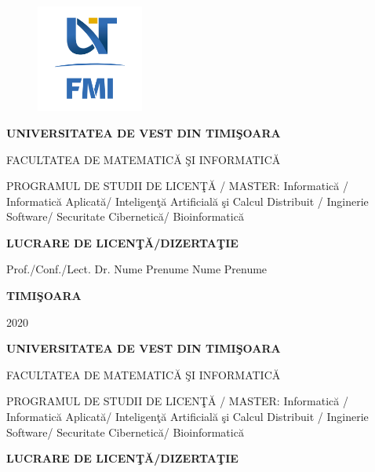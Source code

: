 \documentclass[12pt,a4paper]{report}
\theoremstyle{definition}
\theoremstyle{remark}
\begin{document}
\thispagestyle{empty}
\begin{center}
\begin{figure}[h!]
\vspace{-20pt}
\begin{center}
\includegraphics[width=100pt]{FMI-03.png}
\end{center}
\end{figure}


{\large{\bf UNIVERSITATEA DE VEST DIN TIMI\c SOARA

FACULTATEA DE MATEMATIC\u A \c SI INFORMATIC\u A

PROGRAMUL DE STUDII DE LICEN\c T\u A / MASTER: Informatic\u a / Informatic\u a Aplicat\u a/ Inteligen\c t\u a Artificial\u a \c si Calcul Distribuit / Inginerie Software/ Securitate Cibernetic\u a/ Bioinformatic\u a }}

\vspace{120pt}
{\huge {\bf LUCRARE DE LICEN\c T\u A/DIZERTA\c TIE}}

\vspace{150pt}
\end{center}

{\large{}

\noindent Prof./Conf./Lect. Dr. Nume Prenume \hfill Nume Prenume}

\vfill
\begin{center}
{\bf TIMI\c SOARA

2020}
\end{center}
\newpage
\thispagestyle{empty}
\begin{center}
{\large{\bf UNIVERSITATEA DE VEST DIN TIMI\c SOARA

FACULTATEA DE MATEMATIC\u A \c SI INFORMATIC\u A


PROGRAMUL DE STUDII DE LICEN\c T\u A / MASTER: Informatic\u a / Informatic\u a Aplicat\u a/ Inteligen\c t\u a Artificial\u a \c si Calcul Distribuit / Inginerie Software/ Securitate Cibernetic\u a/ Bioinformatic\u a }}

\vspace{120pt}
{\huge {\bf LUCRARE DE LICEN\c T\u A/DIZERTA\c TIE}}

\vspace{150pt}
\end{center}
\end{document}
